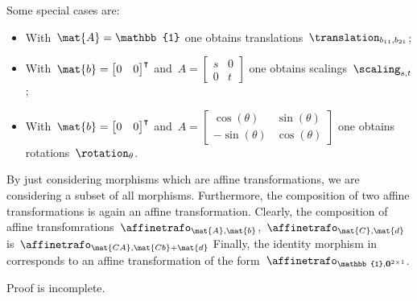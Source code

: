 \begin{solution}
\begin{itemize}
              Some special cases are:
              \begin{itemize}
                  \item With~$\mat{A}=\mathbb{1}$ one obtains translations~$\translation_{b_{11},b_{21}}$;
                  \item With~$\mat{b}=\begin{bmatrix}0&0\end{bmatrix}^\intercal$ and~$A=\begin{bmatrix} s&0\\0&t\end{bmatrix}$ one obtains scalings~$\scaling_{s,t}$;
                  \item With~$\mat{b}=\begin{bmatrix}0&0\end{bmatrix}^\intercal$ and~$A=\begin{bmatrix} \cos(\theta)&\sin(\theta)\\-\sin(\theta)&\cos(\theta)\end{bmatrix}$ one obtains rotations~$\rotation_{\theta}$.
              \end{itemize}
              By just considering morphisms which are affine transformations, we are considering a subset of all morphisms.
              Furthermore, the composition of two affine transformations is again an affine transformation.
              Clearly, the composition of affine transfomrations~$\affinetrafo_{\mat{A},\mat{b}}$,~$\affinetrafo_{\mat{C},\mat{d}}$ is~$\affinetrafo_{\mat{CA},\mat{Cb}+\mat{d}}$
              Finally, the identity morphism in \Draw corresponds to an affine transformation of the form~$\affinetrafo_{\mathbb{1},\mathbf{0}^{2\times 1}}$.
    \end{itemize}

    \begin{publictodo}
        Proof is incomplete.
    \end{publictodo}
\end{solution}

